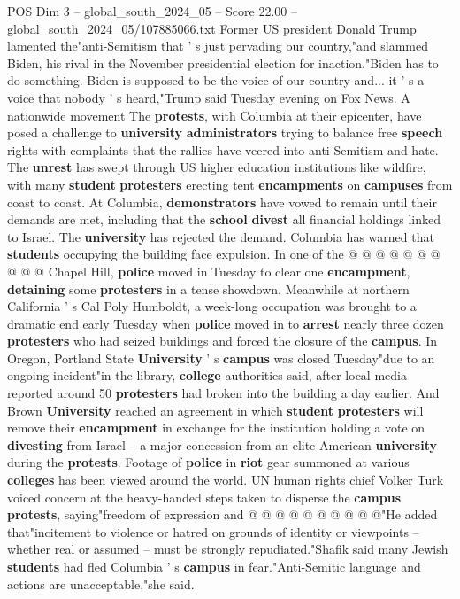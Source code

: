 \begin{textsample}{POS Dim 3 – global\_south\_2024\_05 – Score 22.00 – global\_south\_2024\_05/107885066.txt}
Former US president Donald Trump lamented the"anti-Semitism that ' s just pervading our country,"and slammed Biden, his rival in the November presidential election for inaction."Biden has to do something.
Biden is supposed to be the voice of our country and... it ' s a voice that nobody ' s heard,"Trump said Tuesday evening on Fox News.
A nationwide movement The \textbf{protests}, with Columbia at their epicenter, have posed a challenge to \textbf{university} \textbf{administrators} trying to balance free \textbf{speech} rights with complaints that the rallies have veered into anti-Semitism and hate.
The \textbf{unrest} has swept through US higher education institutions like wildfire, with many \textbf{student} \textbf{protesters} erecting tent \textbf{encampments} on \textbf{campuses} from coast to coast.
At Columbia, \textbf{demonstrators} have vowed to remain until their demands are met, including that the \textbf{school} \textbf{divest} all financial holdings linked to Israel.
The \textbf{university} has rejected the demand.
Columbia has warned that \textbf{students} occupying the building face expulsion.
In one of the @ @ @ @ @ @ @ @ @ @ Chapel Hill, \textbf{police} moved in Tuesday to clear one \textbf{encampment}, \textbf{detaining} some \textbf{protesters} in a tense showdown.
Meanwhile at northern California ' s Cal Poly Humboldt, a week-long occupation was brought to a dramatic end early Tuesday when \textbf{police} moved in to \textbf{arrest} nearly three dozen \textbf{protesters} who had seized buildings and forced the closure of the \textbf{campus}.
In Oregon, Portland State \textbf{University} ' s \textbf{campus} was closed Tuesday"due to an ongoing incident"in the library, \textbf{college} authorities said, after local media reported around 50 \textbf{protesters} had broken into the building a day earlier.
And Brown \textbf{University} reached an agreement in which \textbf{student} \textbf{protesters} will remove their \textbf{encampment} in exchange for the institution holding a vote on \textbf{divesting} from Israel -- a major concession from an elite American \textbf{university} during the \textbf{protests}.
Footage of \textbf{police} in \textbf{riot} gear summoned at various \textbf{colleges} has been viewed around the world.
UN human rights chief Volker Turk voiced concern at the heavy-handed steps taken to disperse the \textbf{campus} \textbf{protests}, saying"freedom of expression and @ @ @ @ @ @ @ @ @ @"He added that"incitement to violence or hatred on grounds of identity or viewpoints -- whether real or assumed -- must be strongly repudiated."Shafik said many Jewish \textbf{students} had fled Columbia ' s \textbf{campus} in fear."Anti-Semitic language and actions are unacceptable,"she said.

\end{textsample}
